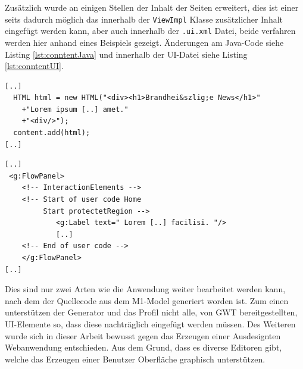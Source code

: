 Zusätzlich wurde an einigen Stellen der Inhalt der Seiten erweitert, dies ist
einer seits dadurch möglich das innerhalb der \texttt{ViewImpl} Klasse zusätzlicher
Inhalt eingefügt werden kann, aber auch innerhalb der \texttt{.ui.xml} Datei,
beide verfahren werden hier anhand eines Beispiels gezeigt. Änderungen am
Java-Code siehe Listing \ref{lst:conntentJava} und innerhalb der UI-Datei siehe
Listing \ref{lst:conntentUI}.

\lstset{language=gwt}
\begin{lstlisting}[caption={Einfügen von Inhalten auf einer Seite durch
Veränderungen am Java-Code, hier in der \texttt{NewsViewImpl.java}},
label={lst:conntentJava}] 
[..] 
  HTML html = new HTML("<div><h1>Brandhei&szlig;e News</h1>"
	+"Lorem ipsum [..] amet."
	+"<div/>");
  content.add(html);
[..]
\end{lstlisting}
\lstset{language=gwt}
\begin{lstlisting}[caption={Einfügen von Inhalten auf einer Seite durch
Veränderungen am UI.XML-Datei, hier in der \texttt{HomeViewImpl.ui.xml}},
label={lst:conntentUI}] 
[..] 
 <g:FlowPanel>
	<!-- InteractionElements -->
	<!-- Start of user code Home 
	     Start protectetRegion -->
			<g:Label text=" Lorem [..] facilisi. "/>
			[..]		
	<!-- End of user code -->
	</g:FlowPanel>
[..]
\end{lstlisting}

Dies sind nur zwei Arten wie die Anwendung weiter bearbeitet werden kann,
nach dem der Quellecode aus dem M1-Model generiert worden ist. Zum einen
unterstützen der Generator und das Profil nicht alle, von GWT
bereitgestellten, UI-Elemente so, dass diese nachträglich eingefügt werden müssen.
Des Weiteren wurde sich in dieser Arbeit bewusst gegen das Erzeugen einer
Ausdesignten Webanwendung entschieden. Aus dem Grund, dass es diverse
Editoren gibt, welche das Erzeugen einer Benutzer Oberfläche graphisch
unterstützen.
